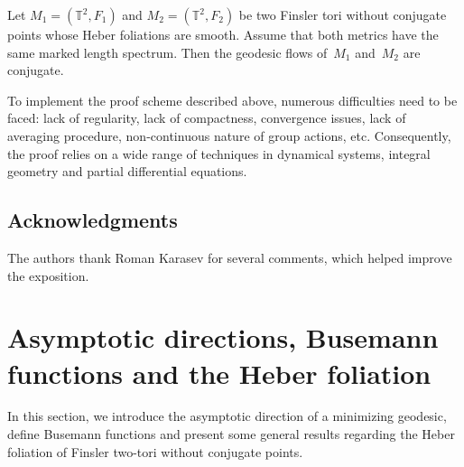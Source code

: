 \documentclass[AHL,Unicode,longabstracts,published]{cedram}
\newcommand{\T}{\mathbb{T}}
\begin{document}
\begin{theo}
Let $M_1=(\T^2,F_1)$ and $M_2=(\T^2,F_2)$ be two Finsler tori without conjugate points whose Heber foliations are smooth. Assume that both metrics have the same marked length spectrum. Then the geodesic flows of~$M_1$ and~$M_2$ are conjugate.
\end{theo}


To implement the proof scheme described above, numerous difficulties need to be faced: lack of regularity, lack of compactness, convergence issues, lack of averaging procedure, non-continuous nature of group actions, etc. Consequently, the proof relies on a wide range of techniques in dynamical systems, integral geometry and partial differential equations.

\subsection*{Acknowledgments} 
The authors thank Roman Karasev for several comments, which helped improve the exposition.



\section{Asymptotic directions, Busemann functions and the Heber foliation} \label{sec:foliation}

In this section, we introduce the asymptotic direction of a minimizing geodesic, define Busemann functions and present some general results regarding the Heber foliation of Finsler two-tori without conjugate points.
\end{document}
